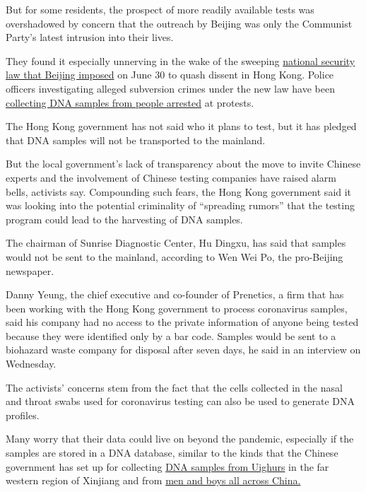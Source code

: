 But for some residents, the prospect of more readily available tests was
overshadowed by concern that the outreach by Beijing was only the
Communist Party's latest intrusion into their lives.

They found it especially unnerving in the wake of the sweeping
\href{https://www.nytimes.com/2020/07/31/world/asia/hong-kong-election-national-security-law.html}{national
security law that Beijing imposed} on June 30 to quash dissent in Hong
Kong. Police officers investigating alleged subversion crimes under the
new law have been
\href{https://www.nytimes.com/2020/07/05/world/asia/hong-kong-security-law.html}{collecting
DNA samples from people arrested} at protests.

The Hong Kong government has not said who it plans to test, but it has
pledged that DNA samples will not be transported to the mainland.

But the local government's lack of transparency about the move to invite
Chinese experts and the involvement of Chinese testing companies have
raised alarm bells, activists say. Compounding such fears, the Hong Kong
government said it was looking into the potential criminality of
``spreading rumors'' that the testing program could lead to the
harvesting of DNA samples.

The chairman of Sunrise Diagnostic Center, Hu Dingxu, has said that
samples would not be sent to the mainland, according to Wen Wei Po, the
pro-Beijing newspaper.

Danny Yeung, the chief executive and co-founder of Prenetics, a firm
that has been working with the Hong Kong government to process
coronavirus samples, said his company had no access to the private
information of anyone being tested because they were identified only by
a bar code. Samples would be sent to a biohazard waste company for
disposal after seven days, he said in an interview on Wednesday.

The activists' concerns stem from the fact that the cells collected in
the nasal and throat swabs used for coronavirus testing can also be used
to generate DNA profiles.

Many worry that their data could live on beyond the pandemic, especially
if the samples are stored in a DNA database, similar to the kinds that
the Chinese government has set up for collecting
\href{https://www.nytimes.com/2019/02/21/business/china-xinjiang-uighur-dna-thermo-fisher.html}{DNA
samples from Uighurs} in the far western region of Xinjiang and from
\href{https://www.nytimes.com/2020/06/17/world/asia/China-DNA-surveillance.html}{men
and boys all across China.}

